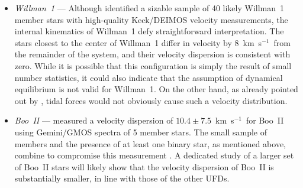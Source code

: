\documentclass[a4paper]{ar-1col}
\newcommand{\kms}         {km~s$^{-1}$}
\begin{document}
\begin{itemize}

\item \emph{Willman~1} --- Although \citet{willman11} identified a
  sizable sample of 40 likely Willman~1 member stars with high-quality
  Keck/DEIMOS velocity measurements, the internal kinematics of
  Willman~1 defy straightforward interpretation.  The stars closest to
  the center of Willman~1 differ in velocity by 8~\kms\ from the
  remainder of the system, and their velocity dispersion is consistent
  with zero.  While it is possible that this configuration is simply
  the result of small number statistics, it could also indicate that
  the assumption of dynamical equilibrium is not valid for Willman~1.
  On the other hand, as already pointed out by \citet{willman11},
  tidal forces would not obviously cause such a velocity distribution.

\item \emph{Boo~II} --- \citet{koch09} measured a velocity dispersion
  of $10.4 \pm 7.5$~\kms\ for Boo~II using Gemini/GMOS spectra of 5
  member stars.  The small sample of members and the presence of at
  least one binary star, as mentioned above, combine to compromise
  this measurement \citep{ji16b}.  A dedicated study of a larger set
  of Boo~II stars will likely show that the velocity dispersion of
  Boo~II is substantially smaller, in line with those of the other
  UFDs.


\end{itemize}
\end{document}
